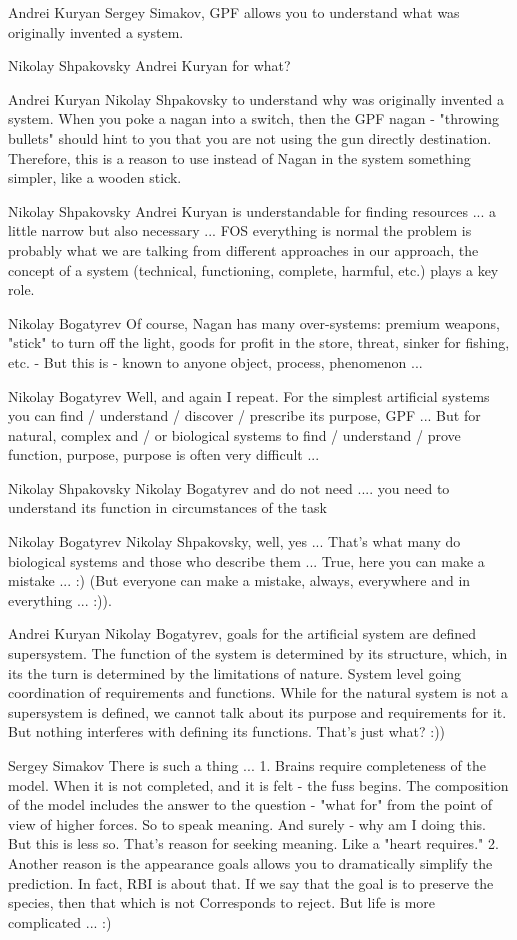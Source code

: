 \documentclass[11pt,a4paper]{article}
\begin{document}
Andrei Kuryan Sergey Simakov, GPF allows you to understand what was originally
invented a system.

Nikolay Shpakovsky Andrei Kuryan for what?

Andrei Kuryan Nikolay Shpakovsky to understand why was originally invented a
system. When you poke a nagan into a switch, then the GPF nagan - "throwing
bullets" should hint to you that you are not using the gun directly
destination. Therefore, this is a reason to use instead of Nagan in the system
something simpler, like a wooden stick.

Nikolay Shpakovsky Andrei Kuryan is understandable for finding resources ... a
little narrow but also necessary ... FOS everything is normal the problem is
probably what we are talking from different approaches in our approach, the
concept of a system (technical, functioning, complete, harmful, etc.) plays a
key role.

Nikolay Bogatyrev Of course, Nagan has many over-systems: premium weapons,
"stick" to turn off the light, goods for profit in the store, threat, sinker
for fishing, etc. - But this is - known to anyone object, process, phenomenon
...

Nikolay Bogatyrev Well, and again I repeat. For the simplest artificial
systems you can find / understand / discover / prescribe its purpose, GPF
... But for natural, complex and / or biological systems to find / understand
/ prove function, purpose, purpose is often very difficult ...

Nikolay Shpakovsky Nikolay Bogatyrev and do not need .... you need to
understand its function in circumstances of the task

Nikolay Bogatyrev Nikolay Shpakovsky, well, yes ... That's what many do
biological systems and those who describe them ... True, here you can make a
mistake ... :) (But everyone can make a mistake, always, everywhere and in
everything ... :)).

Andrei Kuryan Nikolay Bogatyrev, goals for the artificial system are defined
supersystem. The function of the system is determined by its structure, which,
in its the turn is determined by the limitations of nature. System level going
coordination of requirements and functions. While for the natural system is
not a supersystem is defined, we cannot talk about its purpose and
requirements for it. But nothing interferes with defining its
functions. That's just what? :))

Sergey Simakov There is such a thing ... 1. Brains require completeness of the
model. When it is not completed, and it is felt - the fuss begins. The
composition of the model includes the answer to the question - "what for" from
the point of view of higher forces. So to speak meaning. And surely - why am I
doing this. But this is less so. That's reason for seeking meaning. Like a
"heart requires." 2. Another reason is the appearance goals allows you to
dramatically simplify the prediction. In fact, RBI is about that.  If we say
that the goal is to preserve the species, then that which is not Corresponds
to reject. But life is more complicated ... :)
\end{document}
